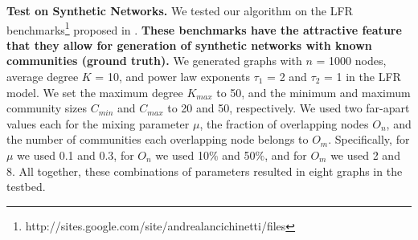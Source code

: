 {\bf Test on Synthetic Networks. } We tested our algorithm on the LFR benchmarks\footnote{http://sites.google.com/site/andrealancichinetti/files} proposed in \cite{2008PhRvE..78d6110L}. {\bf These benchmarks have the attractive feature that they allow
for generation of synthetic networks with known communities (ground truth). }
We generated graphs with $n$ = 1000 nodes, average degree $K$ = 10, and power law exponents $\tau_1$ = 2 and $\tau_2$ = 1 in the LFR model. We set the maximum degree $K_{max}$ to 50, and the minimum and maximum community sizes $C_{min}$ and $C_{max}$ to 20 and 50, respectively. We used two far-apart values each for the mixing parameter $\mu$, the fraction of overlapping nodes $O_n$, and the number of communities each overlapping node belongs to $O_m$. Specifically, for $\mu$ we used 0.1 and 0.3, for $O_n$ we used 10$\%$ and 50$\%$, and for $O_m$ we used 2 and 8. 
All together, these combinations of parameters resulted in eight graphs in the testbed.


